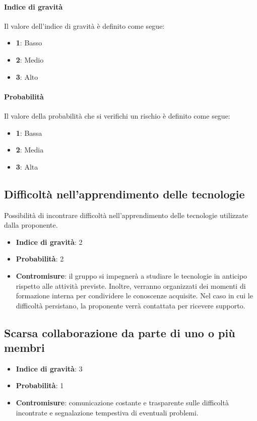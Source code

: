 \documentclass[italian,12pt]{article} %
\begin{document}
\paragraph{Indice di gravità} Il valore dell'indice di gravità è definito come segue:
\begin{itemize}
	\itemsep0em
	\item \textbf{1}: Basso
	\item \textbf{2}: Medio
	\item \textbf{3}: Alto
\end{itemize}

\paragraph{Probabilità} Il valore della probabilità che si verifichi un rischio è definito come segue:
\begin{itemize}
	\itemsep0em
	\item \textbf{1}: Bassa
	\item \textbf{2}: Media
	\item \textbf{3}: Alta
\end{itemize}

\subsection{Difficoltà nell'apprendimento delle tecnologie}
Possibilità di incontrare difficoltà nell'apprendimento delle tecnologie utilizzate dalla proponente.
\begin{itemize}
	\item \textbf{Indice di gravità}: 2
	\item \textbf{Probabilità}: 2
	\item \textbf{Contromisure}: il gruppo si impegnerà a studiare le tecnologie in anticipo rispetto alle attività previste.
	      Inoltre, verranno organizzati dei momenti di formazione interna per condividere le conoscenze acquisite.
	      Nel caso in cui le difficoltà persistano, la proponente verrà contattata per ricevere supporto.
\end{itemize}

\subsection{Scarsa collaborazione da parte di uno o più membri}
\begin{itemize}
	\item \textbf{Indice di gravità}: 3
	\item \textbf{Probabilità}: 1
	\item \textbf{Contromisure}: comunicazione costante e trasparente sulle
	      difficoltà incontrate e segnalazione tempestiva di eventuali problemi.
\end{itemize}
\end{document}
